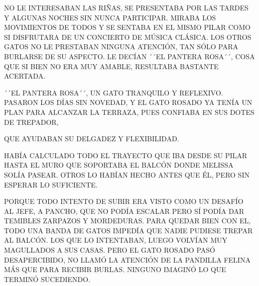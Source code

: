 NO LE INTERESABAN LAS RIÑAS, SE PRESENTABA POR LAS TARDES Y ALGUNAS NOCHES  SIN NUNCA PARTICIPAR. MIRABA LOS MOVIMIENTOS DE TODOS Y SE SENTABA EN EL MISMO PILAR COMO SI DISFRUTARA DE UN CONCIERTO DE MÚSICA CLÁSICA.  
LOS OTROS GATOS NO LE PRESTABAN NINGUNA ATENCIÓN, TAN SÓLO PARA BURLARSE DE SU ASPECTO. LE DECÍAN ´´EL PANTERA ROSA´´, COSA QUE SI BIEN NO ERA MUY AMABLE,  RESULTABA BASTANTE ACERTADA.



\newpage
{}
´´EL PANTERA ROSA´´, UN GATO TRANQUILO Y REFLEXIVO. PASARON LOS DÍAS SIN NOVEDAD, Y EL GATO ROSADO YA TENÍA UN PLAN PARA ALCANZAR LA TERRAZA, PUES CONFIABA EN SUS DOTES 	DE TREPADOR, 
\begin{flushright}
	\begin{minipage}[r]{.56\textwidth}
		QUE AYUDABAN SU DELGADEZ Y FLEXIBILIDAD. 
		
		HABÍA CALCULADO TODO EL TRAYECTO QUE IBA DESDE SU PILAR HASTA EL MURO QUE SOPORTABA EL BALCÓN DONDE MELISSA SOLÍA PASEAR. OTROS LO HABÍAN HECHO ANTES QUE ÉL, PERO SIN ESPERAR LO SUFICIENTE. 
	\end{minipage}	
\end{flushright}


\newpage
{}
PORQUE TODO INTENTO DE SUBIR ERA VISTO COMO UN DESAFÍO AL JEFE, A PANCHO, QUE NO PODÍA ESCALAR PERO SÍ PODÍA DAR TEMIBLES ZARPAZOS Y MORDEDURAS.
PARA QUEDAR BIEN CON EL, TODO UNA BANDA DE GATOS IMPEDÍA QUE NADIE PUDIESE TREPAR AL BALCÓN. LOS QUE LO INTENTABAN, LUEGO VOLVÍAN MUY MAGULLADOS A SUS CASAS.
PERO EL GATO ROSADO PASÓ DESAPERCIBIDO, NO LLAMÓ LA ATENCIÓN DE LA PANDILLA FELINA MÁS QUE PARA RECIBIR BURLAS. NINGUNO IMAGINÓ LO QUE TERMINÓ SUCEDIENDO.

